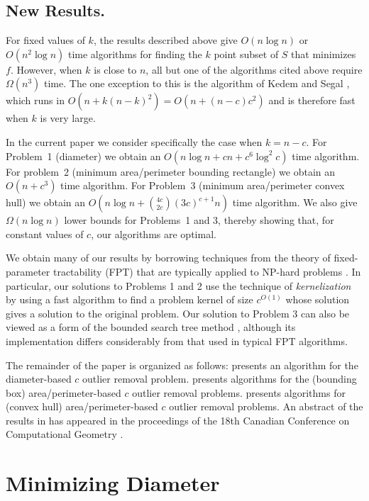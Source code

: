 \documentclass{elsart}
\newcommand{\runtime}{n\log n + {4c\choose 2c}(3c)^{c+1}n}
\newcommand{\Oruntime}{O\left(\runtime\right)}
\begin{document}
\subsection{New Results.}

For fixed values of $k$, the results described above give $O(n\log n)$
or $O(n^2\log n)$ time algorithms for finding the $k$ point subset of
$S$ that minimizes $f$.  However, when $k$ is close to $n$, all but one
of the algorithms cited above require $\Omega(n^3)$ time.  The one
exception to this is the algorithm of Kedem and Segal \cite{sk98}, which
runs in $O(n + k(n-k)^2) = O(n + (n-c)c^2)$ and is therefore fast when
$k$ is very large.

In the current paper we consider specifically the case when $k=n-c$.
For Problem~1 (diameter) we obtain an $O(n\log n + cn + c^6\log^2 c)$
time algorithm.  For problem~2 (minimum area/perimeter bounding
rectangle) we obtain an $O(n + c^3)$ time algorithm.  For Problem~3
(minimum area/perimeter convex hull) we obtain an $\Oruntime$ time
algorithm.  We also give $\Omega(n\log n)$ lower bounds for Problems~1
and 3, thereby showing that, for constant values of $c$, our
algorithms are optimal.

We obtain many of our results by borrowing techniques from the theory
of fixed-parameter tractability (FPT) that are typically applied to
NP-hard problems \cite{df99}.  In particular, our solutions to Problems
1 and 2 use the technique of \emph{kernelization} by using a fast
algorithm to find a problem kernel of size $c^{O(1)}$ whose solution
gives a solution to the original problem.  Our solution to Problem 3
can also be viewed as a form of the bounded search tree method
\cite{df99}, although its implementation differs considerably from that
used in typical FPT algorithms.

The remainder of the paper is organized as follows: 
presents an algorithm for the diameter-based $c$ outlier removal
problem.   presents algorithms for the (bounding box)
area/perimeter-based $c$ outlier removal problems.  
presents algorithms for (convex hull) area/perimeter-based $c$
outlier removal problems.  An abstract of the results in 
has appeared in the proceedings of the 18th Canadian Conference on
Computational Geometry \cite{amw06}.

\section{Minimizing Diameter}
\end{document}
